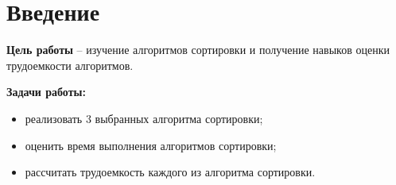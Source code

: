 \chapter*{Введение}
\textbf{Цель работы} – изучение алгоритмов сортировки и получение навыков оценки трудоемкости алгоритмов.

\textbf{Задачи работы:}
\begin{itemize}
	\item реализовать 3 выбранных алгоритма сортировки;
	\item оценить время выполнения алгоритмов сортировки;
	\item рассчитать трудоемкость каждого из алгоритма сортировки.
\end{itemize}
